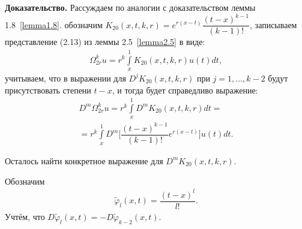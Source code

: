 \textbf{Доказательство.} Рассуждаем по аналогии с доказательством леммы 1.8~\eqref{lemma1.8}. обозначим $ K_{20}(x,t,k,r) = e^{r(x-t)}\dfrac{(t-x)^{k-1}}{(k-1)!} $, записываем представление (2.13) из леммы 2.5~\eqref{lemma2.5} в виде:
\begin{equation}
\begin{array}{c}
\nonumber

\Omega_{2r}^ku = r^k\int\limits_x^1 K_{20}(x,t,k,r)u(t)dt,

\end{array}
\end{equation}
учитываем, что в выражении для $ D^jK_{20}(x,t,k,r) $ при $ j=1,...,k-2 $ будут присутствовать степени $ t-x $, и тогда будет справедливо выражение:
\begin{equation}
\begin{array}{c}

D^m\Omega_{2r}^ku = r^k\int\limits_x^1 D^mK_{20}(x,t,k,r)dt = \\ = r^k\int\limits_x^1 D^m\biggl[\dfrac{(t-x)^{k-1}}{(k-1)!}e^{r(x-t)}\biggr]u(t)dt.

\end{array}
\end{equation}

Осталось найти конкретное выражение для $ D^mK_{20}(x,t,k,r) $.

Обозначим
\begin{equation}
\begin{array}{c}
\nonumber

\widetilde\varphi_l(x,t) = \dfrac{(t-x)^l}{l!}.

\end{array}
\end{equation}
Учтём, что $ D\widetilde\varphi_l(x,t) = -D\widetilde\varphi_{k-2}(x,t) $.

